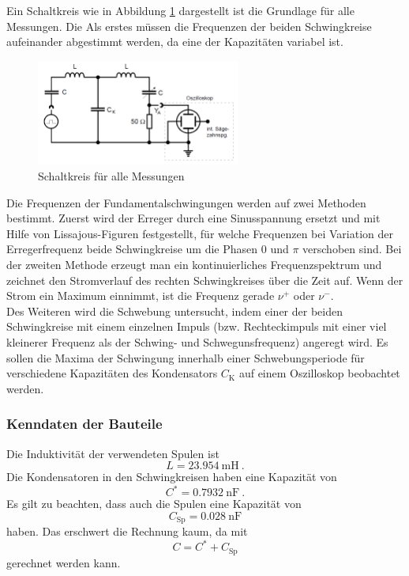 Ein Schaltkreis wie in Abbildung \ref{fig:Abb6} dargestellt ist die Grundlage für alle Messungen. Die Als erstes müssen die Frequenzen der beiden Schwingkreise aufeinander abgestimmt werden, da eine der Kapazitäten variabel ist. \\
\begin{figure}[h!]
	\centering
	\includegraphics[width=0.6\textwidth]{Abb6.png}
	\caption{Schaltkreis für alle Messungen}
	\label{fig:Abb6}
\end{figure}
Die Frequenzen der Fundamentalschwingungen werden auf zwei Methoden bestimmt. Zuerst wird der Erreger durch eine Sinusspannung ersetzt und mit Hilfe von Lissajous-Figuren festgestellt, für welche Frequenzen bei Variation der Erregerfrequenz beide Schwingkreise um die Phasen 0 und $\pi$ verschoben sind. Bei der zweiten Methode erzeugt man ein kontinuierliches Frequenzspektrum und zeichnet den Stromverlauf des rechten Schwingkreises über die Zeit auf. Wenn der Strom ein Maximum einnimmt, ist die Frequenz gerade $\nu^+$ oder $\nu^-$. \\
Des Weiteren wird die Schwebung untersucht, indem einer der beiden Schwingkreise mit einem einzelnen Impuls (bzw. Rechteckimpuls mit einer viel kleinerer Frequenz als der Schwing- und Schwegunsfrequenz) angeregt wird. Es sollen die Maxima der Schwingung innerhalb einer Schwebungsperiode für verschiedene Kapazitäten des Kondensators $C_\text{K}$ auf einem Oszilloskop beobachtet werden.
\subsubsection*{Kenndaten der Bauteile \label{sec:Bauteile}}
Die Induktivität der verwendeten Spulen ist
\[ L = \SI{23.954}{\milli\henry} \ . \]
Die Kondensatoren in den Schwingkreisen haben eine Kapazität von
\[ C^* = \SI{0.7932}{\nano\farad} \ . \]
Es gilt zu beachten, dass auch die Spulen eine Kapazität von
\[ C_\text{Sp} = \SI{0.028}{\nano\farad} \]
haben. Das erschwert die Rechnung kaum, da mit
\[ C = C^* + C_\text{Sp} \]
gerechnet werden kann. \\
